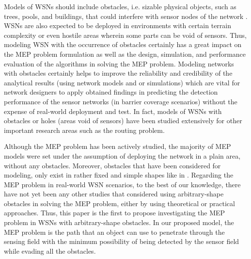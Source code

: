 \documentclass[final]{elsarticle}
\begin{document}
Models of WSNs should include obstacles, i.e. sizable physical objects, such as trees, pools, and buildings, that could interfere with sensor nodes of the network \cite{chatzigiannakis2007model,jardosh2005real,jardosh2003towards,chatzigiannakis2006modeling}. WSNs are also expected to be deployed in environments with certain terrain complexity or even hostile areas wherein some parts can be void of sensors. Thus, modeling WSN with the occurrence of obstacles certainly has a great impact on the MEP problem formulation as well as the design, simulation, and performance evaluation of the algorithms in solving the MEP problem. Modeling networks with obstacles certainly helps to improve the reliability and credibility of the analytical results (using network models and or simulations) which are vital for network designers to apply obtained findings in predicting the detection performance of the sensor networks (in barrier coverage scenarios) without the expense of real-world deployment and test. In fact, models of WSNs with obstacles or holes (areas void of sensors) have been studied extensively for other important research areas such as the routing problem.

Although the MEP problem has been actively studied, the majority of MEP models were set under the assumption of deploying the network in a plain area, without any obstacles. Moreover, obstacles that have been considered for modeling, only exist in rather fixed and simple shapes like in \cite{liu2017obstacle}. Regarding the MEP problem in real-world WSN scenarios, to the best of our knowledge, there have not yet been any other studies that considered using arbitrary-shape obstacles in solving the MEP problem, either by using theoretical or practical approaches. Thus, this paper is the first to propose investigating the MEP problem in WSNs with arbitrary-shape obstacles. In our proposed model, the MEP problem is the path that an object can use to penetrate through the sensing field with the minimum possibility of being detected by the sensor field while evading all the obstacles. 
\end{document}
